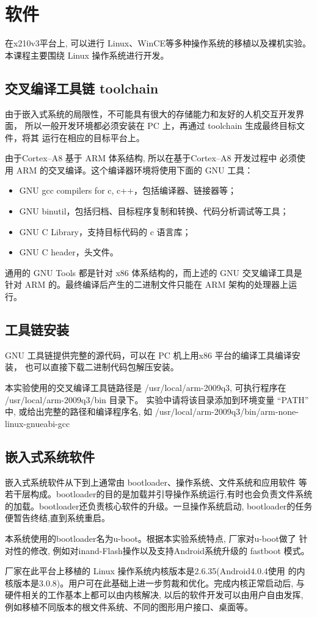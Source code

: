 \section{软件}

	在x210v3平台上, 可以进行 Linux、WinCE等多种操作系统的移植以及裸机实验。
本课程主要围绕 Linux 操作系统进行开发。

\subsection{交叉编译工具链 toolchain}
	由于嵌入式系统的局限性，不可能具有很大的存储能力和友好的人机交互开发界面，
所以一般开发环境都必须安装在 PC 上，再通过 toolchain 生成最终目标文件，将其
运行在相应的目标平台上。

	由于Cortex--A8 基于 ARM 体系结构, 所以在基于Cortex--A8 开发过程中
必须使用 ARM 的交叉编译。这个编译器环境将使用下面的 GNU 工具：
\begin{itemize}\itemsep=-3pt
  \item GNU gcc compilers for c, c++，包括编译器、链接器等；
  \item GNU binutil，包括归档、目标程序复制和转换、代码分析调试等工具；
  \item GNU C Library，支持目标代码的 c 语言库；
  \item GNU C header，头文件。
\end{itemize}
	通用的 GNU Tools 都是针对 x86 体系结构的，而上述的 GNU 交叉编译工具是
针对 ARM 的。最终编译后产生的二进制文件只能在 ARM 架构的处理器上运行。

\subsection{工具链安装}
	GNU 工具链提供完整的源代码，可以在 PC 机上用x86 平台的编译工具编译安装，
也可以直接下载二进制代码包解压安装。

	本实验使用的交叉编译工具链路径是 /usr/local/arm-2009q3, 可执行程序在
 /usr/local/arm-2009q3/bin 目录下。 实验中请将该目录添加到环境变量 ``PATH''
中, 或给出完整的路径和编译程序名, 如
/usr/local/arm-2009q3/bin/arm-none-linux-gnueabi-gcc

\subsection{嵌入式系统软件}
	嵌入式系统软件从下到上通常由 bootloader、操作系统、文件系统和应用软件
等若干层构成。bootloader的目的是加载并引导操作系统运行,有时也会负责文件系统
的加载。bootloader还负责核心软件的升级。一旦操作系统启动, bootloader的任务
便暂告终结,直到系统重启。

	本系统使用的bootloader名为u-boot。根据本实验系统特点, 厂家对u-boot做了
针对性的修改, 例如对inand-Flash操作以及支持Android系统升级的 fastboot 模式。

	厂家在此平台上移植的 Linux 操作系统内核版本是2.6.35(Android4.0.4使用
的内核版本是3.0.8)。用户可在此基础上进一步剪裁和优化。完成内核正常启动后,
与硬件相关的工作基本上都可以由内核解决, 以后的软件开发可以由用户自由发挥,
例如移植不同版本的根文件系统、不同的图形用户接口、桌面等。
